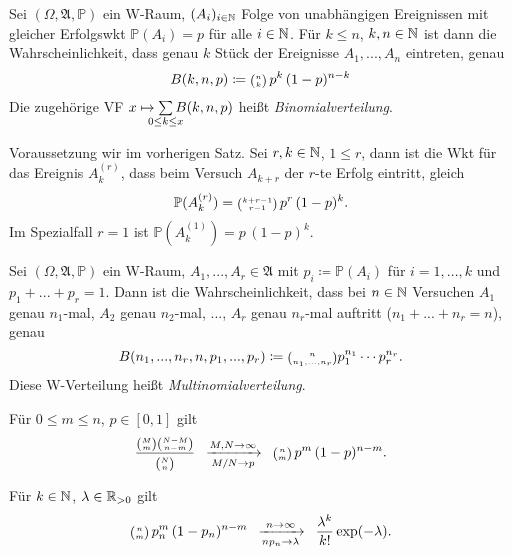\documentclass{cheat-sheet}
\newcommand{\Alg}{\mathfrak{A}} %
\renewcommand{\P}{\mathbb{P}} %
\let\myBinom\binom
\renewcommand{\binom}[2]{\mathsmaller{\myBinom{#1}{#2}}}
\begin{document}


\begin{satz}
  Sei $(\Omega, \Alg, \P)$ ein W-Raum, $(A_i)_{i \in \mathbb{N}}$ Folge von unabhängigen Ereignissen mit gleicher Erfolgswkt $\P(A_i) = p$ für alle $i \in \mathbb{N}$. Für $k \leq n$, $k, n \in \mathbb{N}$ ist dann die Wahrscheinlichkeit, dass genau $k$ Stück der Ereignisse $A_1, ..., A_n$ eintreten, genau
  \[ B(k, n, p) \coloneqq \binom{n}{k} \, p^k \, (1-p)^{n-k} \]
  Die zugehörige VF $x \mapsto \sum_{\mathclap{0 \leq k \leq x}} B(k,n,p)$ heißt \emph{Binomialverteilung}.
\end{satz}


\begin{lem}
  Voraussetzung wir im vorherigen Satz. Sei $r, k \in \mathbb{N}$, $1 \leq r$, dann ist die Wkt für das Ereignis $A_k^{(r)}$, dass beim Versuch $A_{k+r}$ der $r$-te Erfolg eintritt, gleich
  \[ \P(A_k^{(r)}) = \binom{k+r-1}{r-1} \, p^r \, (1-p)^k. \]
  Im Spezialfall $r = 1$ ist $\P(A_k^{(1)}) = p \, (1-p)^k$.
\end{lem}

\begin{satz}
  Sei $(\Omega, \Alg, \P)$ ein W-Raum, $A_1, ..., A_r \in \Alg$ mit $p_i \coloneqq \P(A_i)$ für $i = 1, ..., k$ und $p_1 + ... + p_r = 1$. Dann ist die Wahrscheinlichkeit, dass bei $n \in \mathbb{N}$ Versuchen $A_1$ genau $n_1$-mal, $A_2$ genau $n_2$-mal, ..., $A_r$ genau $n_r$-mal auftritt ($n_1 + ... + n_r = n$), genau
  \[ B(n_1, ..., n_r, n, p_1, ..., p_r) \coloneqq \binom{n}{n_1, ..., n_r} p_1^{n_1} \cdots p_r^{n_r}. \]
  Diese W-Verteilung heißt \emph{Multinomialverteilung}.
\end{satz}


\begin{satz}
  Für $0 \leq m \leq n$, $p \in [0, 1]$ gilt
  \[ \frac{\binom{M}{m} \binom{N-M}{n-m}}{\binom{N}{n}} \enspace \xrightarrow[M/N \to p]{M, N \to \infty} \enspace \binom{n}{m} \, p^m \, (1-p)^{n-m}. \]
\end{satz}


\begin{satz}
  Für $k \in \mathbb{N}$, $\lambda \in \mathbb{R}_{>0}$ gilt
  \[ \binom{n}{m} \, p_n^m \, (1-p_n)^{n-m} \enspace \xrightarrow[n p_n \to \lambda]{n \to \infty} \enspace \frac{\lambda^k}{k!} \exp(-\lambda). \]
\end{satz}
\end{document}
